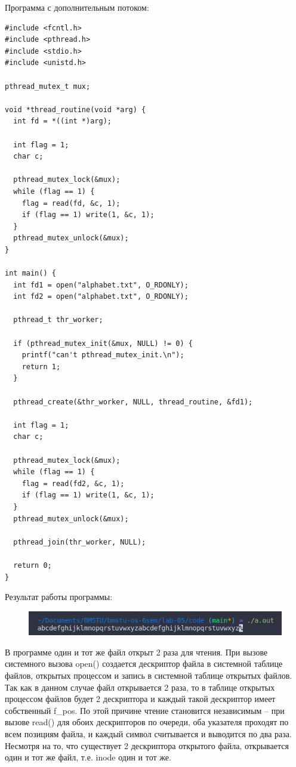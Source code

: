 Программа с дополнительным потоком:
\begin{lstlisting}
#include <fcntl.h>
#include <pthread.h>
#include <stdio.h>
#include <unistd.h>

pthread_mutex_t mux;

void *thread_routine(void *arg) {
  int fd = *((int *)arg);
  
  int flag = 1;
  char c;
  
  pthread_mutex_lock(&mux);
  while (flag == 1) {
    flag = read(fd, &c, 1);
    if (flag == 1) write(1, &c, 1);
  }
  pthread_mutex_unlock(&mux);
}

int main() {
  int fd1 = open("alphabet.txt", O_RDONLY);
  int fd2 = open("alphabet.txt", O_RDONLY);
  
  pthread_t thr_worker;
  
  if (pthread_mutex_init(&mux, NULL) != 0) {
    printf("can't pthread_mutex_init.\n");
    return 1;
  }
  
  pthread_create(&thr_worker, NULL, thread_routine, &fd1);
  
  int flag = 1;
  char c;
  
  pthread_mutex_lock(&mux);
  while (flag == 1) {
    flag = read(fd2, &c, 1);
    if (flag == 1) write(1, &c, 1);
  }
  pthread_mutex_unlock(&mux);
  
  pthread_join(thr_worker, NULL);
  
  return 0;
}
\end{lstlisting}
Результат работы программы:
\begin{figure}[H]
	\centering
	\includegraphics[scale=0.8]{assets/p_2_thread.png}
\end{figure}

В программе один и тот же файл открыт 2 раза для чтения.  При вызове системного вызова open() создается дескриптор файла в системной таблице файлов, открытых процессом и запись в системной таблице открытых  файлов.  Так как в данном случае файл открывается 2 раза, то в таблице открытых процессом файлов будет 2 дескриптора и каждый такой дескриптор имеет собственный f\_pos. По этой причине чтение становится независимым --  при вызове read() для обоих дескрипторов по очереди, оба указателя проходят по всем позициям файла, и каждый символ считывается и выводится по два раза. 
Несмотря на то, что существует 2 дескриптора открытого файла, открывается один и тот же файл, т.е. inode один и тот же.

